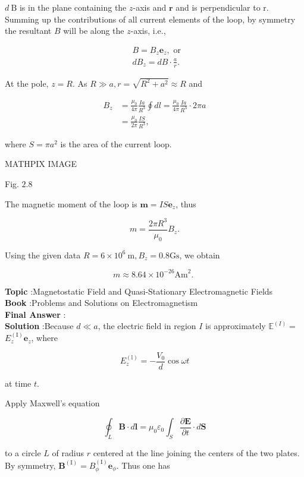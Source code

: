 \documentclass[10pt]{article}
\begin{document}
$d \mathrm{~B}$ is in the plane containing the $z$-axis and $\mathbf{r}$ and is perpendicular to r. Summing up the contributions of all current elements of the loop, by symmetry the resultant $B$ will be along the $z$-axis, i.e.,

$$
\begin{aligned}
&B=B_{z} \mathbf{e}_{z}, \text { or } \\
&d B_{z}=d B \cdot \frac{a}{r} .
\end{aligned}
$$

At the pole, $z=R$. As $R \gg a, r=\sqrt{R^{2}+a^{2}} \approx R$ and

$$
\begin{aligned}
B_{z} &=\frac{\mu_{0}}{4 \pi} \frac{I a}{R^{3}} \oint d l=\frac{\mu_{0}}{4 \pi} \frac{I a}{R^{3}} \cdot 2 \pi a \\
&=\frac{\mu_{0}}{2 \pi} \frac{I S}{R^{3}},
\end{aligned}
$$

where $S=\pi a^{2}$ is the area of the current loop. 

MATHPIX IMAGE

Fig. $2.8$

The magnetic moment of the loop is $\mathbf{m}=I S \mathbf{e}_{z}$, thus

$$
m=\frac{2 \pi R^{3}}{\mu_{0}} B_{z} .
$$

Using the given data $R=6 \times 10^{6} \mathrm{~m}, B_{z}=0.8 \mathrm{Gs}$, we obtain

$$
m \approx 8.64 \times 10^{-26} \mathrm{Am}^{2} \text {. }
$$

\textbf{Topic} :Magnetostatic Field and Quasi-Stationary Electromagnetic Fields\\
\textbf{Book} :Problems and Solutions on Electromagnetism\\
\textbf{Final Answer} :\\


\textbf{Solution} :Because $d \ll a$, the electric field in region $I$ is approximately $\mathbb{E}^{(I)}=$ $E_{z}^{(\mathrm{I})} \mathbf{e}_{z}$, where

$$
E_{z}^{(\mathrm{l})}=-\frac{V_{0}}{d} \cos \omega t
$$

at time $t$.

Apply Maxwell's equation

$$
\oint_{L} \mathbf{B} \cdot d \mathbf{l}=\mu_{0} \varepsilon_{0} \int_{S} \frac{\partial \mathbf{E}}{\partial t} \cdot d \mathbf{S}
$$

to a circle $L$ of radius $r$ centered at the line joining the centers of the two plates. By symmetry, $\mathbf{B}^{(\mathrm{I})}=B_{\phi}^{(\mathrm{I})} \mathbf{e}_{\phi}$. Thus one has
\end{document}
